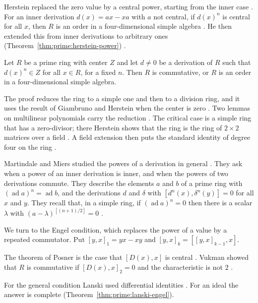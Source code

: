 Herstein replaced the zero value by a central power, starting from the inner
case \cite[p.~163]{Herstein1982Power}. For an inner derivation $d(x)=ax-xa$
with $a$ not central, if $d(x)^{n}$ is central for all $x$, then $R$ is an
order in a four-dimensional simple algebra \cite[p.~163]{Herstein1982Power}.
He then extended this from inner derivations to arbitrary ones
(Theorem~\ref{thm:prime:herstein-power}) \cite[p.~163]{Herstein1982Power}.

\begin{theorem}\label{thm:prime:herstein-power}
Let $R$ be a prime ring with center $Z$ and let $d\neq 0$ be a derivation of $R$
such that $d(x)^{n}\in Z$ for all $x\in R$, for a fixed $n$. Then $R$ is
commutative, or $R$ is an order in a four-dimensional simple algebra.
\end{theorem}

The proof reduces the ring to a simple one and then to a division ring, and it
uses the result of Giambruno and Herstein when the center is zero
\cite[p.~163]{Herstein1982Power}. Two lemmas on multilinear polynomials carry
the reduction \cite[Lemmas~1 and~2, p.~163]{Herstein1982Power}. The critical
case is a simple ring that has a zero-divisor; there Herstein shows that the
ring is the ring of $2\times2$ matrices over a field \cite[Theorem~3,
p.~169]{Herstein1982Power}. A field extension then puts the standard identity
of degree four on the ring \cite[p.~170]{Herstein1982Power}.

Martindale and Miers studied the powers of a derivation in general
\cite[p.~179]{MartindaleMiers1983}. They ask when a power of an inner
derivation is inner, and when the powers of two derivations commute. They
describe the elements $a$ and $b$ of a prime ring with
$(\operatorname{ad}a)^n=\operatorname{ad}b$, and the derivations $d$ and
$\delta$ with $[d^n(x),\delta^n(y)]=0$ for all $x$ and $y$.
They recall that, in a simple ring, if
$(\operatorname{ad}a)^n=0$ then there is a scalar $\lambda$ with
$(a-\lambda)^{[(n+1)/2]}=0$ \cite[p.~179]{MartindaleMiers1983}.

We turn to the Engel condition, which replaces the power of a value by a
repeated commutator. Put $[y,x]_1=yx-xy$ and $[y,x]_k=[[y,x]_{k-1},x]$.

The theorem of Posner is the case that $[D(x),x]$ is central
\cite[p.~731]{Lanski1993}. Vukman showed that $R$ is commutative if
$[D(x),x]_2=0$ and the characteristic is not $2$ \cite[p.~731]{Lanski1993}.

For the general condition Lanski used differential identities
\cite[p.~731]{Lanski1993}. For an ideal the answer is complete
(Theorem~\ref{thm:prime:lanski-engel}).

